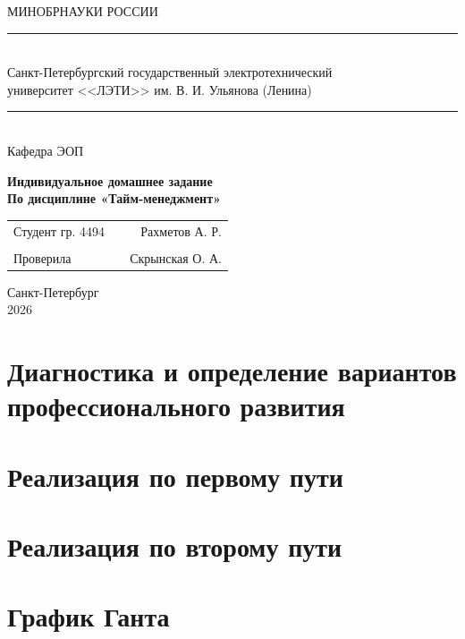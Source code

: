 \documentclass{etulab}
\renewcommand{\maketitle}{
    \begin{titlepage}
        \begin{center}
            МИНОБРНАУКИ РОССИИ \\
            \rule{10cm}{0.4pt} \\
            Санкт-Петербургский государственный электротехнический \\
            университет <<ЛЭТИ>> им. В. И. Ульянова (Ленина) \\
            \rule{10cm}{0.4pt} \\
            Кафедра \mDepartment
        \end{center}

        \vfill

        \begin{center}
            \textbf{
                Индивидуальное домашнее задание \\
                По дисциплине «\mDiscipline» \\
            }
        \end{center}

        \vfill

        \noindent
        \begin{tabularx}{\textwidth}{l X r}
            Студент гр. \mGroup & \hrulefill & \mStudentName \\\\
            Проверила    & \hrulefill & \mTeacherName
        \end{tabularx}

        \vfill

        \begin{center}
            Санкт-Петербург \\
            \mYear \\
        \end{center}
        \thispagestyle{empty}
    \end{titlepage}
    \newpage
    \setcounter{page}{2}
}
\newcommand{\mDepartment}{ЭОП}
\newcommand{\mDiscipline}{Тайм-менеджмент}
\newcommand{\mGroup}{4494}
\newcommand{\mStudentName}{Рахметов А. Р.}
\newcommand{\mTeacherName}{Скрынская О. А.}
\newcommand{\mYear}{2026}
\begin{document}
\maketitle



\tableofcontents
\thispagestyle{empty}
\newpage



\newpage
{}
{}



\newpage
\section{{Диагностика и определение вариантов профессионального развития}}


\newpage
\section{{Реализация по первому пути}}


\newpage
\section{{Реализация по второму пути}}


\newpage
\section{{График Ганта}}



\newpage
{}
{}






%     
\end{document}
